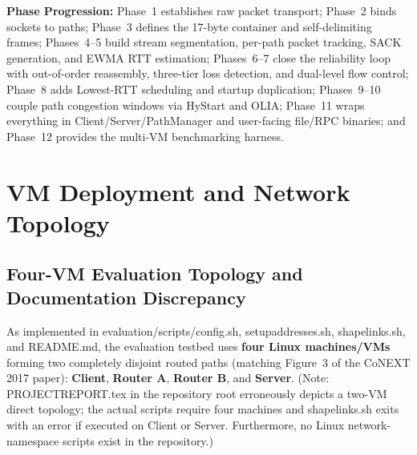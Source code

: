 \documentclass[10pt,a4paper]{article}
\newcommand{\codeul}{\textunderscore\hspace{0pt}}
\DeclareRobustCommand{\code}[1]{{\ttfamily\let\_\codeul #1}}
\begin{document}
\textbf{Phase Progression:} Phase~1 establishes raw packet transport; Phase~2 binds sockets to paths; Phase~3 defines the 17-byte container and self-delimiting frames; Phases~4--5 build stream segmentation, per-path packet tracking, SACK generation, and EWMA RTT estimation; Phases~6--7 close the reliability loop with out-of-order reassembly, three-tier loss detection, and dual-level flow control; Phase~8 adds Lowest-RTT scheduling and startup duplication; Phases~9--10 couple path congestion windows via HyStart and OLIA; Phase~11 wraps everything in \code{Client}/\code{Server}/\code{PathManager} and user-facing file/RPC binaries; and Phase~12 provides the multi-VM benchmarking harness.

\section{VM Deployment and Network Topology}

\subsection{Four-VM Evaluation Topology and Documentation Discrepancy}
As implemented in \code{evaluation/scripts/config.sh}, \code{setup\_addresses.sh}, \code{shape\_links.sh}, and \code{README.md}, the evaluation testbed uses \textbf{four Linux machines/VMs} forming two completely disjoint routed paths (matching Figure~3 of the CoNEXT 2017 paper): \textbf{Client}, \textbf{Router A}, \textbf{Router B}, and \textbf{Server}. (Note: \code{PROJECT\_REPORT.tex} in the repository root erroneously depicts a two-VM direct topology; the actual scripts require four machines and \code{shape\_links.sh} exits with an error if executed on Client or Server. Furthermore, no Linux network-namespace scripts exist in the repository.)
\end{document}
